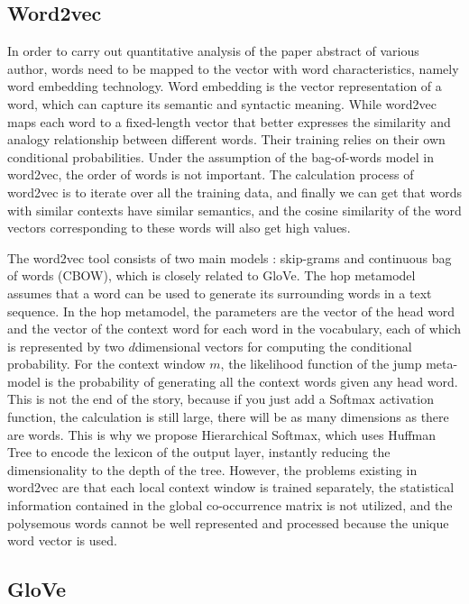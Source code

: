 \documentclass[conference]{IEEEtran}
\begin{document}
\subsection{Word2vec}

In order to carry out quantitative analysis of the paper abstract of
various author, words need to be mapped to the vector with word
characteristics, namely word embedding technology. Word embedding is the
vector representation of a word, which can capture its semantic and
syntactic meaning. While word2vec \cite{7389336} maps each word to a
fixed-length vector that better expresses the similarity \cite{https://doi.org/10.48550/arxiv.2204.04833} and analogy
relationship between different words. Their training relies on their own
conditional probabilities. Under the assumption of the bag-of-words
model in word2vec, the order of words is not important. The calculation
process of word2vec is to iterate over all the training data, and
finally we can get that words with similar contexts have similar
semantics, and the cosine similarity of the word vectors corresponding
to these words will also get high values.

The word2vec tool consists of two main models \cite{7259377}: skip-grams and
continuous bag of words (CBOW), which is closely related to
GloVe. The hop metamodel assumes that a word can be used to generate its
surrounding words in a text sequence. In the hop metamodel, the
parameters are the vector of the head word and the vector of the context
word for each word in the vocabulary, each of which is represented by
two \(d\)dimensional vectors for computing the conditional probability.
For the context window \(m\), the likelihood function of the jump
meta-model is the probability of generating all the context words given
any head word. This is not the end of the story, because if you just add
a Softmax \cite{8852459} activation function, the calculation is still large, there
will be as many dimensions as there are words. This is why we propose
Hierarchical Softmax, which uses Huffman Tree to encode the lexicon of
the output layer, instantly reducing the dimensionality to the depth of
the tree. However, the problems existing in word2vec are that each local
context window is trained separately, the statistical information
contained in the global co-occurrence matrix is not utilized, and the
polysemous words cannot be well represented and processed because the
unique word vector is used.


\subsection{GloVe}
\end{document}

